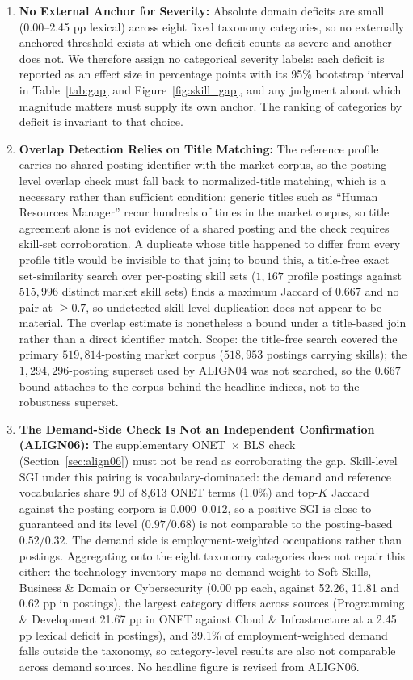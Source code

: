\documentclass[journal]{IEEEtran}
\begin{document}
\begin{enumerate}
    \item \textbf{No External Anchor for Severity:} Absolute domain deficits are small (0.00--2.45 pp lexical) across eight fixed taxonomy categories, so no externally anchored threshold exists at which one deficit counts as severe and another does not. We therefore assign no categorical severity labels: each deficit is reported as an effect size in percentage points with its 95\% bootstrap interval in Table~\ref{tab:gap} and Figure~\ref{fig:skill_gap}, and any judgment about which magnitude matters must supply its own anchor. The ranking of categories by deficit is invariant to that choice.
\item \textbf{Overlap Detection Relies on Title Matching:} The reference profile carries no shared posting identifier with the market corpus, so the posting-level overlap check must fall back to normalized-title matching, which is a necessary rather than sufficient condition: generic titles such as ``Human Resources Manager'' recur hundreds of times in the market corpus, so title agreement alone is not evidence of a shared posting and the check requires skill-set corroboration. A duplicate whose title happened to differ from every profile title would be invisible to that join; to bound this, a title-free exact set-similarity search over per-posting skill sets ($1{,}167$ profile postings against $515{,}996$ distinct market skill sets) finds a maximum Jaccard of $0.667$ and no pair at $\geq 0.7$, so undetected skill-level duplication does not appear to be material. The overlap estimate is nonetheless a bound under a title-based join rather than a direct identifier match. Scope: the title-free search covered the primary $519{,}814$-posting market corpus ($518{,}953$ postings carrying skills); the $1{,}294{,}296$-posting superset used by ALIGN04 was not searched, so the $0.667$ bound attaches to the corpus behind the headline indices, not to the robustness superset.
    \item \textbf{The Demand-Side Check Is Not an Independent Confirmation (ALIGN06):} The supplementary O\*NET~$\times$ BLS check (Section~\ref{sec:align06}) must not be read as corroborating the gap. Skill-level SGI under this pairing is vocabulary-dominated: the demand and reference vocabularies share 90 of 8,613 O\*NET terms (1.0\%) and top-$K$ Jaccard against the posting corpora is $0.000$--$0.012$, so a positive SGI is close to guaranteed and its level ($0.97/0.68$) is not comparable to the posting-based $0.52/0.32$. The demand side is employment-weighted occupations rather than postings. Aggregating onto the eight taxonomy categories does not repair this either: the technology inventory maps no demand weight to Soft Skills, Business \& Domain or Cybersecurity (0.00 pp each, against 52.26, 11.81 and 0.62 pp in postings), the largest category differs across sources (Programming \& Development 21.67 pp in O\*NET against Cloud \& Infrastructure at a 2.45 pp lexical deficit in postings), and 39.1\% of employment-weighted demand falls outside the taxonomy, so category-level results are also not comparable across demand sources. No headline figure is revised from ALIGN06.
\end{enumerate}
\end{document}
